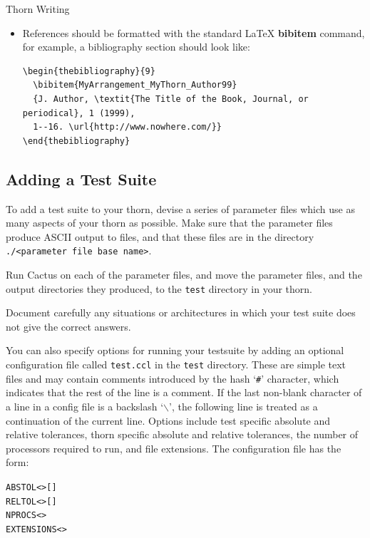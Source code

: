 \begin{cactuspart}{Thorn Writing}
\begin{itemize}
 \item References should be formatted with the standard LaTeX {\bf
        bibitem} command, for example, a bibliography section should
        look like:
%
\begin{verbatim}
\begin{thebibliography}{9}
  \bibitem{MyArrangement_MyThorn_Author99}
  {J. Author, \textit{The Title of the Book, Journal, or periodical}, 1 (1999),
  1--16. \url{http://www.nowhere.com/}}
\end{thebibliography}
\end{verbatim}

\end{itemize}


\subsection{Adding a Test Suite}
\label{sec:adding_test_suite}

To add a test suite to your thorn, devise a series of parameter
files which use as many aspects of your thorn as possible.
Make sure that the parameter files produce ASCII output to files,
and that these files are in the directory
\texttt{./<parameter file base name>}.

Run Cactus on each of the parameter files, and move the parameter files,
and the output directories they produced, to the \texttt{test} directory
in your thorn.

Document carefully any situations or architectures in which your test
suite does not give the correct answers.

You can also specify options for running your testsuite by adding an
optional configuration file called \texttt{test.ccl} in the \texttt{test}
directory. These are simple text files and may contain comments
introduced by the hash `\texttt{\#}' character, which indicates that the
rest of the line is a comment. If the last non-blank character of a
line in a config file is a backslash `\texttt{$\backslash$}', the
following line is treated as a continuation of the current line.
Options include test specific absolute and relative tolerances, thorn
specific absolute and relative tolerances, the number of processors required
to run, and file extensions. The configuration file has the form:

\begin{alltt}
ABSTOL  <> []
RELTOL  <> []
NPROCS  <>
EXTENSIONS  <  >


\end{alltt}
\end{cactuspart}
